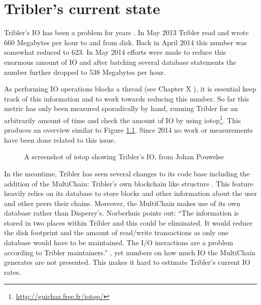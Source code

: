 \chapter{Tribler's current state}

Tribler's IO has been a problem for years \cite{pouwelse2014reduce}.
In May 2013 Tribler read and wrote 660 Megabytes per hour to and from disk.
Back in April 2014 this number was somewhat reduced to 623.
In May 2014 efforts were made to reduce this enormous amount of IO and after batching several database statements the number further dropped to 538 Megabytes per hour.

As performing IO operations blocks a thread (see Chapter X ), it is essential keep track of this information and to work towards reducing this number.
So far this metric has only been measured sporadically by hand, running Tribler for an arbitrarily amount of time and check the amount of IO by using iotop\footnote{\url{http://guichaz.free.fr/iotop/}}.
This produces an overview similar to Figure \ref{fig:iotop_tribler_april_2014}.
Since 2014 no work or measurements have been done related to this issue.

\begin{figure}[h]
	\caption{A screenshot of iotop showing Tribler's IO, from Johan Pouwelse \cite{pouwelse2014reduce}}
	\label{fig:iotop_tribler_april_2014}
\end{figure}

In the meantime, Tribler has seen several changes to its code base including the addition of the MultiChain: Tribler's own blockchain like structure \cite{norberhuis2015multichain}.
This feature heavily relies on its database to store blocks and other information about the user and other peers their chains.
Moreover, the MultiChain makes use of its own database rather than Dispersy's.
Norberhuis points out: ``The information is stored in two places within Tribler and this could be eliminated. It would reduce the disk footprint and the amount of read/write transactions as only one database would have to be maintained. The I/O ineractions are a problem according to Tribler maintainers.'' \cite{norberhuis2015multichain}, yet numbers on how much IO the MultiChain generates are not presented.
This makes it hard to estimate Tribler's current IO rates.
 
